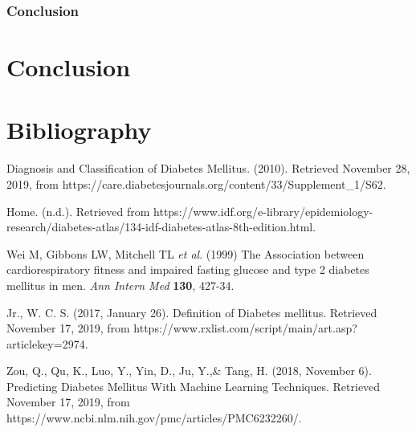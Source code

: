 \documentclass[12pt]{article}
\begin{document}

\newpage
\section{Conclusion}


\newpage
\part{Conclusion}

\clearpage
\newpage
\part{Bibliography}
\begin{thebibliography}{}
Diagnosis and Classification of Diabetes Mellitus. (2010). Retrieved November 28, 2019, from https://care.diabetesjournals.org/content/33/Supplement\_1/S62.

Home. (n.d.). Retrieved from https://www.idf.org/e-library/epidemiology-research/diabetes-atlas/134-idf-diabetes-atlas-8th-edition.html.

Wei M, Gibbons LW, Mitchell TL \textit{et al}. (1999) The Association between cardiorespiratory fitness and impaired fasting glucose and type 2 diabetes mellitus in men. \textit{Ann Intern Med} \textbf{130}, 427-34.

Jr., W. C. S. (2017, January 26). Definition of Diabetes mellitus. Retrieved November 17, 2019, from https://www.rxlist.com/script/main/art.asp?articlekey=2974.

Zou, Q., Qu, K., Luo, Y., Yin, D., Ju, Y.,\& Tang, H. (2018, November 6). Predicting Diabetes Mellitus With Machine Learning Techniques. Retrieved November 17, 2019, from https://www.ncbi.nlm.nih.gov/pmc/articles/PMC6232260/.


\end{thebibliography}
\end{document}
